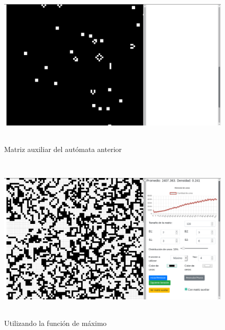 \documentclass[12pt, titlepage]{article}
\begin{document}
\begin{figure}[H]
\begin{center}
 \includegraphics[width=15cm, height=8cm]{./img/2336-min-aux.png}
 \caption{Matriz auxiliar del autómata anterior}
 \label{fig:2336-min-aux}
\end{center}
\end{figure}

\begin{figure}[H]
\begin{center}
 \includegraphics[width=15cm, height=8cm]{./img/2336-max.png}
 \caption{Utilizando la función de máximo}
 \label{fig:2336-max}
\end{center}
\end{figure}
\end{document}
